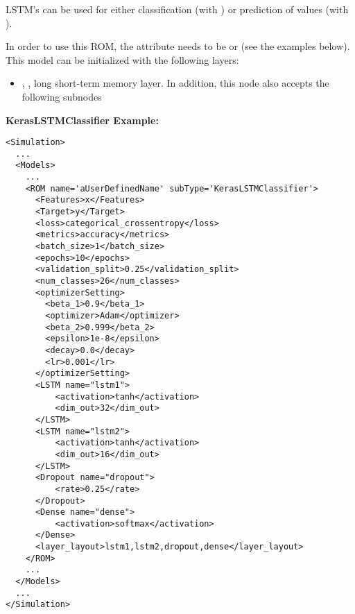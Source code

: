 LSTM's can be used for either classification (with
) or prediction of values (with
).


In order to use this ROM, the  attribute  needs to
be  or  (see the examples below). This model can be initialized with
the following layers:

\begin{itemize}
  \DenseLayer
  \DropoutLayer
  \item {}, , long short-term memory layer.
    \layerNameAttr
    In addition, this node also accepts the following subnodes
    \begin{itemize}
        \activation
        \dimOut
        \recurrentActivation
        \dropout
        \recurrentDropout
        \returnSequence
        \useBias
        \recurrentInitializer
        \biasInitializer
        \unitForgetBias
        \recurrentRegularizer
        \biasRegularizer
        \activityRegularizer
        \recurrentConstraint
        \biasConstraint
        \implementation
        \returnState
        \goBackwards
        \stateful
        \unroll
    \end{itemize}
\end{itemize}

\textbf{KerasLSTMClassifier Example:}
\begin{lstlisting}[style=XML,morekeywords={name,subType}]
<Simulation>
  ...
  <Models>
    ...
    <ROM name='aUserDefinedName' subType='KerasLSTMClassifier'>
      <Features>x</Features>
      <Target>y</Target>
      <loss>categorical_crossentropy</loss>
      <metrics>accuracy</metrics>
      <batch_size>1</batch_size>
      <epochs>10</epochs>
      <validation_split>0.25</validation_split>
      <num_classes>26</num_classes>
      <optimizerSetting>
        <beta_1>0.9</beta_1>
        <optimizer>Adam</optimizer>
        <beta_2>0.999</beta_2>
        <epsilon>1e-8</epsilon>
        <decay>0.0</decay>
        <lr>0.001</lr>
      </optimizerSetting>
      <LSTM name="lstm1">
          <activation>tanh</activation>
          <dim_out>32</dim_out>
      </LSTM>
      <LSTM name="lstm2">
          <activation>tanh</activation>
          <dim_out>16</dim_out>
      </LSTM>
      <Dropout name="dropout">
          <rate>0.25</rate>
      </Dropout>
      <Dense name="dense">
          <activation>softmax</activation>
      </Dense>
      <layer_layout>lstm1,lstm2,dropout,dense</layer_layout>
    </ROM>
    ...
  </Models>
  ...
</Simulation>
\end{lstlisting}

